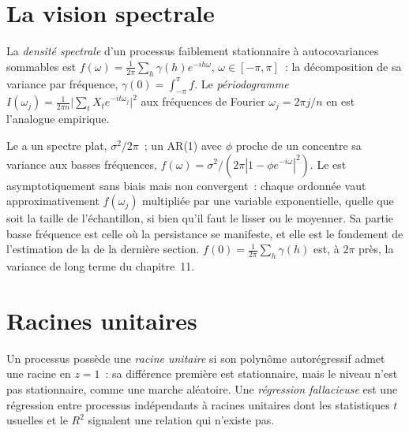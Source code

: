 \section{La vision spectrale}

\begin{definition}\label{def:qm:linear-time-series:spectral}
La \emph{densité spectrale} d'un processus faiblement stationnaire à autocovariances sommables est $f(\omega) = \frac1{2\pi}\sum_h\gamma(h)e^{-ih\omega}$,
$\omega \in [-\pi, \pi]$~: la décomposition de sa variance par fréquence, $\gamma(0) = \int_{-\pi}^\pi f$. Le \emph{périodogramme} $I(\omega_j) =
\frac1{2\pi n}\bigl\lvert\sum_tX_te^{-it\omega_j}\bigr\rvert^2$ aux fréquences de Fourier $\omega_j = 2\pi j/n$ en est l'analogue empirique.
\end{definition}

Le  a un spectre plat, $\sigma^2/2\pi$~; un AR(1) avec $\phi$ proche de un concentre sa variance aux basses fréquences, $f(\omega) =
\sigma^2/(2\pi|1 - \phi e^{-i\omega}|^2)$. Le  est asymptotiquement sans biais mais non convergent~: chaque ordonnée vaut approximativement $f(\omega_j)$ multipliée par
une variable exponentielle, quelle que soit la taille de l'échantillon, si bien qu'il faut le lisser ou le moyenner. Sa partie basse fréquence est celle où la persistance se manifeste, et elle est
le fondement de l'estimation de la  de la dernière section. $f(0) = \frac1{2\pi}\sum_h\gamma(h)$ est, à $2\pi$ près, la variance de long terme du
chapitre~11.

\section{Racines unitaires}

\begin{definition}\label{def:qm:linear-time-series:unitroot}
Un processus possède une \emph{racine unitaire} si son polynôme autorégressif admet une racine en $z = 1$~: sa différence première est stationnaire, mais le niveau
n'est pas stationnaire, comme une marche aléatoire. Une \emph{régression fallacieuse} est une régression entre processus indépendants à racines unitaires dont les statistiques
$t$ usuelles et le $R^2$ signalent une relation qui n'existe pas.
\end{definition}


